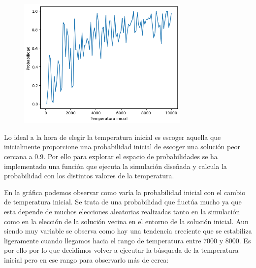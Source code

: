 \documentclass[a4paper,12pt]{article}
\begin{document}
	\begin{figure}[H]
		\centering
		\includegraphics[width=0.75\textwidth]{include/Temperaturas/grafico1.png}
	\end{figure}

	Lo ideal a la hora de elegir la temperatura inicial es escoger aquella que inicialmente proporcione una probabilidad inicial de escoger una solución peor cercana a 0.9. Por ello para explorar el espacio de probabilidades se ha implementado una función que ejecuta la simulación diseñada y calcula la probabilidad con los distintos valores de la temperatura. 

	En la gráfica podemos observar como varía la probabilidad inicial con el cambio de temperatura inicial. Se trata de una probabilidad que fluctúa mucho ya que esta depende de muchos elecciones aleatorias realizadas tanto en la simulación como en la elección de la solución vecina en el entorno de la solución inicial. Aun siendo muy variable se observa como hay una tendencia creciente que se estabiliza ligeramente cuando llegamos hacia el rango de temperatura entre 7000 y 8000. Es por ello por lo que decidimos volver a ejecutar la búsqueda de la temperatura inicial pero en ese rango para observarlo más de cerca:
	
\end{document}
